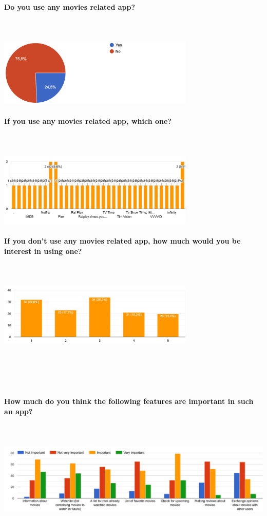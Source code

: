 \documentclass[12pt, a4paper]{article}
\begin{document}
\paragraph{Do you use any movies related app?}\mbox{}\\\\
\includegraphics[width=0.7\textwidth]{Images/app.png}

\paragraph{If you use any movies related app, which one?}\mbox{}\\\\
\includegraphics[width=0.7\textwidth]{images/appUsed.png}

\paragraph{If you don't use any movies related app, how much would you be interest in using one?}\mbox{}\\\\
\includegraphics[width=0.7\textwidth]{images/interesting.png}\\\\\\\\\\

\paragraph{How much do you think the following features are important in such an app?}\mbox{}\\\\
\includegraphics[width=1\textwidth]{Images/features.png}
\end{document}

